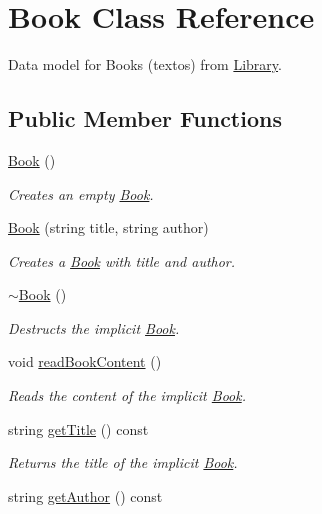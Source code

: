 \hypertarget{class_book}{}\section{Book Class Reference}
\label{class_book}


Data model for Books (textos) from \hyperlink{class_library}{Library}.  


\subsection*{Public Member Functions}
\begin{DoxyCompactItemize}
\item 
\hyperlink{class_book_a2eac9e235a08763158f78533f7a83e1f}{Book} ()
\begin{DoxyCompactList}\small\item\em Creates an empty \hyperlink{class_book}{Book}. \end{DoxyCompactList}\item 
\hyperlink{class_book_a98dad89c9f945e0d846c81ce7e459fbc}{Book} (string title, string author)
\begin{DoxyCompactList}\small\item\em Creates a \hyperlink{class_book}{Book} with title and author. \end{DoxyCompactList}\item 
\hyperlink{class_book_a0ba8eceb34ea1301bc08942e37824767}{$\sim$\+Book} ()
\begin{DoxyCompactList}\small\item\em Destructs the implicit \hyperlink{class_book}{Book}. \end{DoxyCompactList}\item 
void \hyperlink{class_book_a3e62d70f19bf6fa8ebef5556882b3ed7}{read\+Book\+Content} ()
\begin{DoxyCompactList}\small\item\em Reads the content of the implicit \hyperlink{class_book}{Book}. \end{DoxyCompactList}\item 
string \hyperlink{class_book_aa3dc09f8db785a89259a0e491292987d}{get\+Title} () const 
\begin{DoxyCompactList}\small\item\em Returns the title of the implicit \hyperlink{class_book}{Book}. \end{DoxyCompactList}\item 
string \hyperlink{class_book_a3bd4acccf78a82061fc6c78107757620}{get\+Author} () const 

\end{DoxyCompactItemize}
